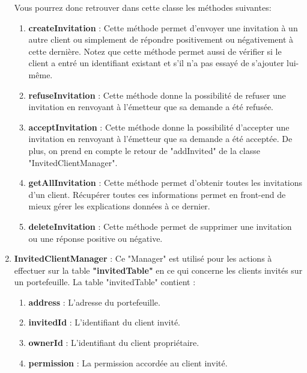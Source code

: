 \begin{enumerate}
Vous pourrez donc retrouver dans cette classe les méthodes suivantes:
\begin{enumerate}
\item \textbf{createInvitation} :\newline
Cette méthode permet d'envoyer une invitation à un autre client ou simplement de répondre positivement ou négativement à cette dernière.\newline
Notez que cette méthode permet aussi de vérifier si le client a entré un identifiant existant et s'il n'a pas essayé de s'ajouter lui-même.
\item \textbf{refuseInvitation} :\newline
Cette méthode donne la possibilité de refuser une invitation en renvoyant à l'émetteur que sa demande a été refusée.
\item \textbf{acceptInvitation} :\newline
Cette méthode donne la possibilité d'accepter une invitation en renvoyant à l'émetteur que sa demande a été acceptée.\newline
De plus, on prend en compte le retour de "addInvited" de la classe "InvitedClientManager".
\item \textbf{getAllInvitation} :\newline
Cette méthode permet d'obtenir toutes les invitations d'un client.\newline
Récupérer toutes ces informations permet en front-end de mieux gérer les explications données à ce dernier.
\item \textbf{deleteInvitation} :\newline
Cette méthode permet de supprimer une invitation ou une réponse positive ou négative.
\end{enumerate}

\item \textbf{InvitedClientManager} :\newline
Ce "Manager" est utilisé pour les actions à effectuer sur la table \textbf{"invitedTable"} en ce qui concerne les clients invités sur un portefeuille.\newline
La table "invitedTable" contient :
\begin{enumerate}[-]
\item \textbf{address} :\newline
L'adresse du portefeuille.
\item \textbf{invitedId} :\newline
L'identifiant du client invité.
\item \textbf{ownerId} :\newline
L'identifiant du client propriétaire.
\item \textbf{permission} :\newline
La permission accordée au client invité.
\end{enumerate}


\end{enumerate}
